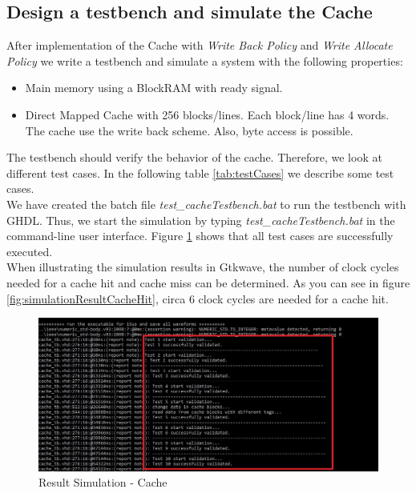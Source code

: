 \begin{figure}
\begin{tikzpicture}[->,>=stealth',shorten >=1pt,auto,semithick,/tikz/initial text=Reset]
\end{tikzpicture}
\end{figure}


\newpage
\subsection{Design a testbench and simulate the Cache}
After implementation of the Cache with \textit{Write Back Policy} and \textit{Write Allocate Policy} we write a testbench and simulate a system with the following properties:
\begin{itemize} 
	\item Main memory using a BlockRAM with ready signal.
	\item Direct Mapped Cache with 256 blocks/lines. Each block/line has 4 words. The cache use the write back scheme. Also, byte access is possible.	
\end{itemize}
The testbench should verify the behavior of the cache. Therefore, we look at different test cases. In the following table \ref{tab:testCases} we describe some test cases.\\
We have created the batch file \textit{test\_cacheTestbench.bat} to run the testbench with GHDL. Thus, we start the simulation by typing \textit{test\_cacheTestbench.bat} in the command-line user interface. Figure \ref{fig:simulationResult} shows that all test cases are successfully executed.\\
When illustrating the simulation results in Gtkwave, the number of clock cycles needed for a cache hit and cache miss can be determined. As you can see in figure \ref{fig:simulationResultCacheHit}, circa 6 clock cycles are needed for a cache hit.
\begin{figure}
	\centering
	\includegraphics[scale=.5]{pictures/simulationResult}
	\caption{Result Simulation - Cache}
	\label{fig:simulationResult}
\end{figure}

